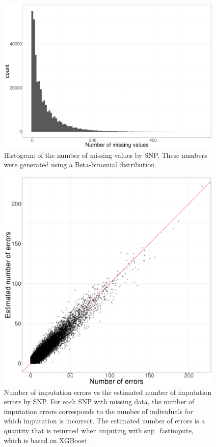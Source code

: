 \documentclass[a4paper, 11pt]{article}
\begin{document}
\begin{figure}[htpb]
\centerline{\includegraphics[width=\textwidth]{hist-NA}}
\caption{Histogram of the number of missing values by SNP. These numbers were generated using a Beta-binomial distribution.}\label{fig:NA}
\end{figure}

\begin{figure}[htpb]
\centerline{\includegraphics[width=\textwidth]{error-impute}}
\caption{Number of imputation errors vs the estimated number of imputation errors by SNP. For each SNP with missing data, the number of imputation errors corresponds to the number of individuals for which imputation is incorrect. The estimated number of errors is a quantity that is returned when imputing with snp\_fastimpute, which is based on XGBoost \cite[]{Chen2016}.}\label{fig:error-impute}
\end{figure}
\end{document}
